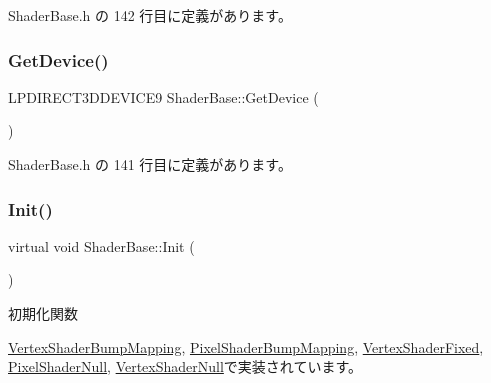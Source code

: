  Shader\+Base.\+h の 142 行目に定義があります。

\mbox{\label{class_shader_base_a4601ff3d20f01800ffd676d3db8d9289}} 
\subsubsection{\texorpdfstring{Get\+Device()}{GetDevice()}}
{\footnotesize\ttfamily L\+P\+D\+I\+R\+E\+C\+T3\+D\+D\+E\+V\+I\+C\+E9 Shader\+Base\+::\+Get\+Device (\begin{DoxyParamCaption}{ }\end{DoxyParamCaption})\hspace{0.3cm}{\ttfamily [inline]}}



 Shader\+Base.\+h の 141 行目に定義があります。

\mbox{\label{class_shader_base_a9622b2f5e0184a78d3af82820dc5113d}} 
\subsubsection{\texorpdfstring{Init()}{Init()}}
{\footnotesize\ttfamily virtual void Shader\+Base\+::\+Init (\begin{DoxyParamCaption}{ }\end{DoxyParamCaption})\hspace{0.3cm}{\ttfamily [pure virtual]}}



初期化関数 



\mbox{\hyperlink{class_vertex_shader_bump_mapping_a6c0f59d1f29fd883943a66bfe61b6b03}{Vertex\+Shader\+Bump\+Mapping}}, \mbox{\hyperlink{class_pixel_shader_bump_mapping_ab7807b7c56242e965ddb23e66e1a5d9e}{Pixel\+Shader\+Bump\+Mapping}}, \mbox{\hyperlink{class_vertex_shader_fixed_ae829ff736b33c45543804059255125b6}{Vertex\+Shader\+Fixed}}, \mbox{\hyperlink{class_pixel_shader_null_abfd7a6a986da09061a55d31024219eba}{Pixel\+Shader\+Null}}, \mbox{\hyperlink{class_vertex_shader_null_af30eb8057fe0537bc6ade214647b6fb5}{Vertex\+Shader\+Null}}で実装されています。

\mbox{\label{class_shader_base_aaac3419f1fce5bf12973e827daadbf8c}} 
